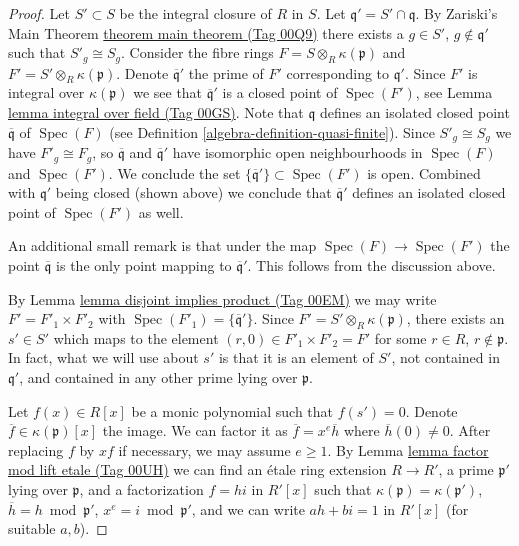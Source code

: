 \documentclass{amsart}
\theoremstyle{plain}
\theoremstyle{definition}
\theoremstyle{remark}
\numberwithin{equation}{subsection}
\def\Spec{\mathop{\mathrm{Spec}}}
\begin{document}
\begin{proof}
Let $S' \subset S$ be the integral closure of $R$ in $S$.
Let $\mathfrak q' = S' \cap \mathfrak q$.
By Zariski's Main Theorem \href{https://stacks.math.columbia.edu/tag/00Q9}{theorem main theorem (Tag 00Q9)}
there exists a $g \in S'$, $g \not \in \mathfrak q'$ such
that $S'_g \cong S_g$. Consider the fibre rings
$F = S \otimes_R \kappa(\mathfrak p)$ and
$F' = S' \otimes_R \kappa(\mathfrak p)$. Denote $\overline{\mathfrak q}'$
the prime of $F'$ corresponding to $\mathfrak q'$. Since
$F'$ is integral over $\kappa(\mathfrak p)$ we see
that $\overline{\mathfrak q}'$ is a closed point of
$\Spec(F')$, see Lemma \href{https://stacks.math.columbia.edu/tag/00GS}{lemma integral over field (Tag 00GS)}.
Note that $\mathfrak q$ defines an isolated closed point
$\overline{\mathfrak q}$ of
$\Spec(F)$ (see Definition \ref{algebra-definition-quasi-finite}).
Since $S'_g \cong S_g$ we have $F'_g \cong F_g$,
so $\overline{\mathfrak q}$ and $\overline{\mathfrak q}'$
have isomorphic open neighbourhoods in $\Spec(F)$
and $\Spec(F')$. We conclude the set
$\{\overline{\mathfrak q}'\} \subset \Spec(F')$ is
open. Combined with $\mathfrak q'$ being closed (shown above)
we conclude that $\overline{\mathfrak q}'$ defines
an isolated closed point of $\Spec(F')$ as well.

\medskip\noindent
An additional small remark is that under the map
$\Spec(F) \to \Spec(F')$ the point $\overline{\mathfrak q}$
is the only point mapping to $\overline{\mathfrak q}'$. This follows
from the discussion above.

\medskip\noindent
By Lemma \href{https://stacks.math.columbia.edu/tag/00EM}{lemma disjoint implies product (Tag 00EM)} we may write
$F' = F'_1 \times F'_2$ with
$\Spec(F'_1) = \{\overline{\mathfrak q}'\}$.
Since $F' = S' \otimes_R \kappa(\mathfrak p)$, there
exists an $s' \in S'$ which maps to the element
$(r, 0) \in F'_1 \times F'_2 = F'$ for some $r \in R$, $r \not \in \mathfrak p$.
In fact, what we will use about $s'$ is that it is an element of $S'$,
not contained in $\mathfrak q'$, and contained in any other prime
lying over $\mathfrak p$.

\medskip\noindent
Let $f(x) \in R[x]$ be a monic polynomial such that $f(s') = 0$.
Denote $\overline{f} \in \kappa(\mathfrak p)[x]$ the image.
We can factor it as $\overline{f} = x^e \overline{h}$ where
$\overline{h}(0) \not = 0$. After replacing $f$
by $x f$ if necessary, we may assume $e \geq 1$.
By Lemma \href{https://stacks.math.columbia.edu/tag/00UH}{lemma factor mod lift etale (Tag 00UH)}
we can find an \'etale ring extension $R \to R'$,
a prime $\mathfrak p'$ lying over $\mathfrak p$, and
a factorization $f = h i$ in $R'[x]$ such that
$\kappa(\mathfrak p) = \kappa(\mathfrak p')$,
$\overline{h} = h \bmod \mathfrak p'$,
$x^e = i \bmod \mathfrak p'$, and
we can write $a h + b i = 1$ in $R'[x]$ (for suitable $a, b$).


\end{proof}
\end{document}
